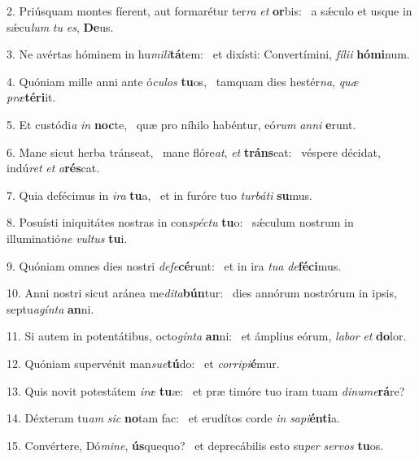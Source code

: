 2. Priúsquam montes fíerent, aut formarétur ter\textit{ra} \textit{et} \textbf{or}bis: \ast\  a sǽculo et usque in sǽcu\textit{lum} \textit{tu} \textit{es}, \textbf{De}us.\

3. Ne avértas hóminem in hu\textit{mi}\textit{li}\textbf{tá}tem: \ast\  et dixísti: Convertímini, \textit{fí}\textit{li}\textit{i} \textbf{hó}\textbf{mi}num.\

4. Quóniam mille anni ante ó\textit{cu}\textit{los} \textbf{tu}os, \ast\  tamquam dies hestér\textit{na}, \textit{quæ} \textit{præ}\textbf{tér}\textbf{i}it.\

5. Et custódi\textit{a} \textit{in} \textbf{noc}te, \ast\  quæ pro níhilo habéntur, eó\textit{rum} \textit{an}\textit{ni} \textbf{e}runt.\

6. Mane sicut herba tránseat, \dag\  mane flóre\textit{at}, \textit{et} \textbf{tráns}eat: \ast\  véspere décidat, indú\textit{ret} \textit{et} \textit{a}\textbf{rés}cat.\

7. Quia defécimus in \textit{i}\textit{ra} \textbf{tu}a, \ast\  et in furóre tuo \textit{tur}\textit{bá}\textit{ti} \textbf{su}mus.\

8. Posuísti iniquitátes nostras in con\textit{spéc}\textit{tu} \textbf{tu}o: \ast\  sǽculum nostrum in illuminatió\textit{ne} \textit{vul}\textit{tus} \textbf{tu}i.\

9. Quóniam omnes dies nostri \textit{de}\textit{fe}\textbf{cé}runt: \ast\  et in ira \textit{tu}\textit{a} \textit{de}\textbf{fé}\textbf{ci}mus.\

10. Anni nostri sicut aránea me\textit{di}\textit{ta}\textbf{bún}tur: \ast\  dies annórum nostrórum in ipsis, septu\textit{a}\textit{gín}\textit{ta} \textbf{an}ni.\

11. Si autem in potentátibus, octo\textit{gín}\textit{ta} \textbf{an}ni: \ast\  et ámplius eórum, \textit{la}\textit{bor} \textit{et} \textbf{do}lor.\

12. Quóniam supervénit man\textit{su}\textit{e}\textbf{tú}do: \ast\  et \textit{cor}\textit{ri}\textit{pi}\textbf{é}mur.\

13. Quis novit potestátem \textit{i}\textit{ræ} \textbf{tu}æ: \ast\  et præ timóre tuo iram tuam \textit{di}\textit{nu}\textit{me}\textbf{rá}re?\

14. Déxteram tu\textit{am} \textit{sic} \textbf{no}tam fac: \ast\  et erudítos corde \textit{in} \textit{sa}\textit{pi}\textbf{én}\textbf{ti}a.\

15. Convértere, Dó\textit{mi}\textit{ne}, \textbf{ús}quequo? \ast\  et deprecábilis esto su\textit{per} \textit{ser}\textit{vos} \textbf{tu}os.\


